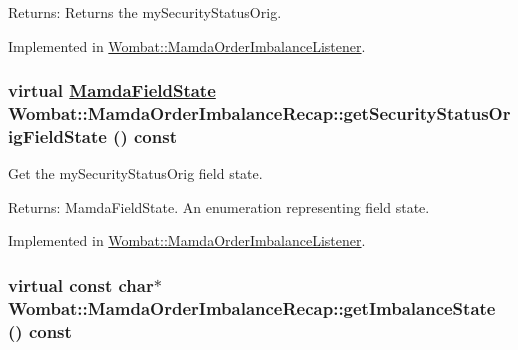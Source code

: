 \begin{Desc}
\item[Returns:]Returns the my\-Security\-Status\-Orig. \end{Desc}


Implemented in \hyperlink{classWombat_1_1MamdaOrderImbalanceListener_ea12f359de6aa79408f26d36ea8db179}{Wombat::Mamda\-Order\-Imbalance\-Listener}.\hypertarget{classWombat_1_1MamdaOrderImbalanceRecap_562a82c0673ef879851e3bbc2f0ac308}{
\subsubsection[getSecurityStatusOrigFieldState]{\setlength{\rightskip}{0pt plus 5cm}virtual \hyperlink{namespaceWombat_93aac974f2ab713554fd12a1fa3b7d2a}{Mamda\-Field\-State} Wombat::Mamda\-Order\-Imbalance\-Recap::get\-Security\-Status\-Orig\-Field\-State () const}}
\label{classWombat_1_1MamdaOrderImbalanceRecap_562a82c0673ef879851e3bbc2f0ac308}


Get the my\-Security\-Status\-Orig field state. 

\begin{Desc}
\item[Returns:]Mamda\-Field\-State. An enumeration representing field state. \end{Desc}


Implemented in \hyperlink{classWombat_1_1MamdaOrderImbalanceListener_1748b68453c66e890d34f666d6525832}{Wombat::Mamda\-Order\-Imbalance\-Listener}.\hypertarget{classWombat_1_1MamdaOrderImbalanceRecap_380353bc10d950df839870cb6423def3}{
\subsubsection[getImbalanceState]{\setlength{\rightskip}{0pt plus 5cm}virtual const char$\ast$ Wombat::Mamda\-Order\-Imbalance\-Recap::get\-Imbalance\-State () const}}
\label{classWombat_1_1MamdaOrderImbalanceRecap_380353bc10d950df839870cb6423def3}


